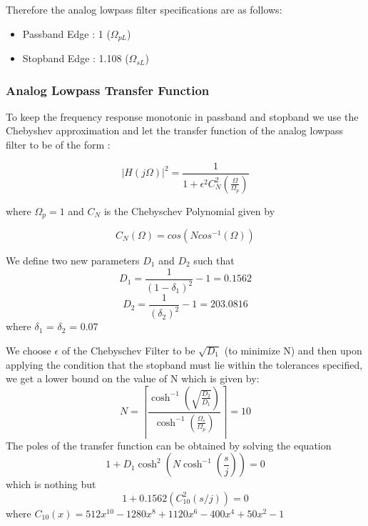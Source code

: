 \documentclass{article}
\begin{document}
\vspace{1em}
\noindent
Therefore the analog lowpass filter specifications are as follows:
\begin{itemize}
    \item Passband Edge : 1 ($\Omega_{pL}$)
    \item Stopband Edge : 1.108 ($\Omega_{sL}$)
\end{itemize}

\subsubsection{Analog Lowpass Transfer Function}
To keep the frequency response monotonic in passband and stopband we use the Chebyshev approximation and let the transfer function of the analog lowpass filter to be of the form : 

\begin{equation*}
    |H(j\Omega)|^2 = \frac{1}{1 + \epsilon^2C^2_{N}(\frac{\Omega}{\Omega_p})}
\end{equation*}

where $\Omega_p = 1$ and $C_N$ is the Chebyschev Polynomial given by

\begin{equation*}
    C_N(\Omega) = cos(Ncos^{-1}(\Omega))
\end{equation*}

\vspace{1em}
\noindent
We define two new parameters $D_1$ and $D_2$ such that
\begin{equation*}
    D_1 = \frac{1}{(1 - \delta_1)^2} - 1 = 0.1562
\end{equation*}
\begin{equation}
    D_2 = \frac{1}{(\delta_2)^2} - 1 = 203.0816
\end{equation}
where $\delta_1$ = $\delta_2$ = 0.07

\vspace{1em}
\noindent
We choose $\epsilon$ of the Chebyschev Filter to be $\sqrt{D_1}$ (to minimize N) and then upon applying the condition that the stopband must lie within the tolerances specified, we get a lower bound on the value of N which is given by:
\begin{equation*}
    N = \left\lceil   \frac{\cosh^{-1}(\sqrt{\frac{D_2}{D_1}})}{\cosh^{-1}(\frac{\Omega_s}{\Omega_p})} \right\rceil = 10
\end{equation*}
The poles of the transfer function can be obtained by solving the equation
\begin{equation*}
    1 + D_1\cosh^2(N\cosh^{-1}(\frac{s}{j})) = 0
\end{equation*}
which is nothing but
\begin{equation*}
    1 + 0.1562(C^2_10(s/j)) = 0
\end{equation*}
where $C_{10}(x) = 512x^{10} - 1280x^8 + 1120x^6 - 400x^4 + 50x^2 - 1$ 
\end{document}
